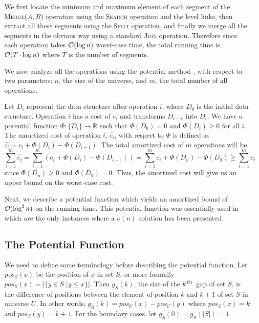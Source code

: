\documentclass[11pt]{article}
\newcommand{\ens}[1]{\ensuremath{#1}}
\newcommand{\kth}{\ens{k^{ \mbox{\hspace{.2mm}\scriptsize th}}}}
\newcommand{\kwMs}{Make-Set}
\newcommand{\kwSpl}{Split}
\newcommand{\kwJoinadj}{Join}
\newcommand{\kwUnion}{Merge}
\newcommand{\kwSrc}{Search}
\newcommand{\Ms}{\mbox{\textsc{\kwMs}}}
\newcommand{\Spl}{\mbox{\textsc{\kwSpl}}}
\newcommand{\Joinadj}{\mbox{\textsc{\kwJoinadj}}}
\newcommand{\Unionx}[2]{\mbox{\textsc{\kwUnion(\ensuremath{#1,#2})}}}
\newcommand{\Src}{\mbox{\textsc{\kwSrc}}}
\newcommand{\segments}{{\segment}s}
\newcommand{\segment}{segment}
\newcommand{\node}[1]{\ensuremath{#1}}
\newcommand{\nodeposition}[2]{pos\ensuremath{_{\set #1}(\node #2)}}
\newcommand{\set}[1]{\ensuremath{#1}}
\newcommand{\numgap}[2]{\ensuremath{g_{\set #1}(#2)}}
\newcommand{\datast}[1]{\ensuremath{D_{#1}}}
\newcommand{\hide}[1]{}
\newcommand{\potfun}[1]{\ensuremath{\Phi(#1)}}
\newcommand{\amcost}[1]{\ensuremath{\hat{c_{#1}}}}
\newcommand{\actcost}[1]{\ensuremath{c_{#1}}}
\begin{document}
We first locate the minimum and maximum element of each \segment{} of the \Unionx{A}{B} operation using the \Src{} operation and the level links, then extract all these \segments{} using the \Spl{} operation, and finally we merge all the \segments{} in the obvious way using a standard \Joinadj{} operation. Therefore since each operation takes ${\cal O}(\log n)$ worst-case time, the total running time is ${\cal O}(T\cdot\log n)$ where $T$ is the number of \segments{}. 
  
We now analyze all the operations using the potential method \cite{amortizedcomplexity}, with respect to two parameters: $n$,\hide{the total number of \Ms{} operations} the size of the universe, and $m$, the total number of all operations. 
  
Let \datast i represent the data structure after operation $i$, where \datast 0 is the initial data structure. Operation $i$ has a cost of \actcost i and transforms $\datast{i-1}$ into $\datast i$. We have a potential function $\Phi : \{\datast i\} \rightarrow\mathbb{R}$ such that $\potfun{\datast 0} = 0$ and $\potfun{\datast i}\geq 0$ for all $i$. The amortized cost of operation $i$, $\amcost i$, with respect to $\Phi$ is defined as $\amcost i = \actcost i + \potfun{\datast i} - \potfun{\datast{i-1}}$. The total amortized cost of $m$ operations will be 
\[ 
\sum_{i=1}^m \amcost i = \sum_{i=1}^m (\actcost i + \potfun{\datast i} - \potfun{\datast{i-1}})= \sum_{i=1}^m \actcost i + \potfun{\datast n} - \potfun{\datast 0} 
\geq \sum_{i=1}^m \actcost i 
\] 
since $\potfun{\datast n}\geq 0$ and $\potfun{\datast 0} = 0$. Thus, the amortized cost will give us an upper bound on the worst-case cost. 


Next, we describe a potential function which yields an amortized bound of ${\cal O}(\log^2 n)$ on the running time. This potential function was essentially used in \cite{DBLP:journals/talg/GeorgiadisKSTW11, journals/algorithmica/FarachT98} which are the only instances where a $o(n)$ solution has been presented. 


\subsection{The Potential Function} 
\label{subsec:LogSQPotFun} 
We need to define some terminology before describing the potential function. Let \nodeposition{S}{x} be the position of $x$ in set $S$, or more formally $\nodeposition{S}{x} = |\{y\in \set S\,|\,y\leq x\}|$. Then $\numgap{S}{k}$, the size of the \kth\ gap of set \set S, is the difference of positions between the element of position $k$ and $k+1$ of set \set S in universe $U$. In other words, $\numgap{S}{k} = \nodeposition{U}{x} - \nodeposition{U}{y}$ where $\nodeposition{S}{x} = k$ and  $\nodeposition{S}{y} = k+1$. For the boundary cases, let $\numgap{S}{0} = \numgap{S}{|S|} = 1$. 
  
\end{document}
